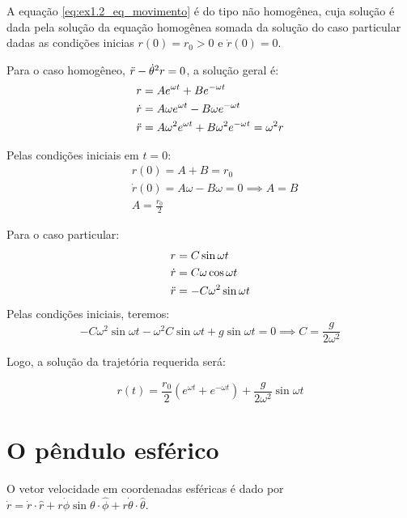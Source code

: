 A equação \eqref{eq:ex1.2_eq_movimento} é do tipo não homogênea, cuja solução é dada pela solução da equação homogênea somada da solução do caso particular dadas as condições inicias $r(0)=r_0 > 0$ e $\dot{r}(0)=0$.

Para o caso homogêneo, $\Ddot{r} - \dot{\theta}^2r =0$, a solução geral é:
\begin{align}
    & r = Ae^{\omega t} +Be^{-\omega t} \\
    & \dot{r} = A\omega e^{\omega t} -B\omega e^{-\omega t} \\
    & \Ddot{r} = A\omega^2 e^{\omega t} +B\omega^2 e^{-\omega t} = \omega ^2 r \\
\end{align}

Pelas condições iniciais em $t=0$:
\begin{align}
    & r(0) = A+B=r_0 \\
    & \dot{r}(0) = A\omega-B\omega=0 \implies A = B \\
    & A = \frac{r_0}{2}
\end{align}

Para o caso particular:
\begin{align}
    & r = C\sin{\omega t} \\
    & \dot{r} = C\omega \cos{\omega t} \\
    & \Ddot{r} = -C\omega^2 \sin{\omega t}
\end{align}
Pelas condições iniciais, teremos:    
\begin{equation}
    -C\omega^2 \sin{\omega t}-\omega^2C\sin{\omega t}+ g \sin{\omega t}=0 \implies C=\frac{g}{2\omega^2}
\end{equation}

Logo, a solução da trajetória requerida será:

\begin{equation}
    r(t)=\frac{r_0}{2}\left (e^{\omega t}+e^{-\omega t} \right )+\frac{g}{2\omega^2}\sin{\omega t}
\end{equation}

        

\section{O pêndulo esférico}

O vetor velocidade em coordenadas esféricas é dado por $\dot{r}=\dot{r}\cdot \hat{r}+r\dot{\phi}\sin{\theta}\cdot \hat{\phi}+r\dot{\theta}\cdot \hat{\theta}$.

